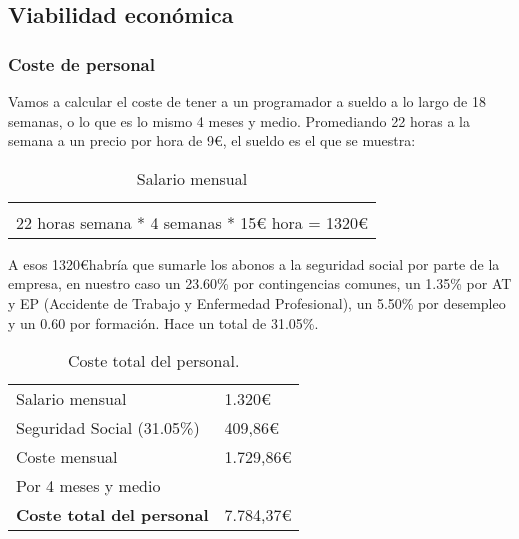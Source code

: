 \subsection{Viabilidad económica}

\subsubsection{Coste de personal}
Vamos a calcular el coste de tener a un programador a sueldo a lo largo de 18 semanas, o lo que es lo mismo 4 meses y medio. Promediando 22 horas a la semana a un precio por hora de 9\euro  , el sueldo es el que se muestra:
\begin{table}[ht!]
\centering
\begin{tabular}{l}
\rowcolor[HTML]{EFEFEF} 
\multicolumn{1}{c}{\cellcolor[HTML]{EFEFEF}\textbf{Salario mensual}} \\
22 horas\/ semana * 4 semanas * 15\euro \/ hora = 1320\euro            
\end{tabular}
\caption{Salario mensual}
\label{CosteMensual}
\end{table}

A esos 1320\euro  habría que sumarle los abonos a la seguridad social por parte de la empresa, en nuestro caso un 23.60\% por contingencias comunes, un 1.35\% por AT y EP (Accidente de Trabajo y Enfermedad Profesional), un 5.50\% por desempleo y un 0.60 por formación. \cite{seguridadsocial} Hace un total de 31.05\%. 

\begin{table}[ht!]
\centering
\label{my-label}
\begin{tabular}{ll}
Salario mensual          	& 1.320\euro    \\
Seguridad Social (31.05\%) 	& 409,86\euro  \\ \hline
Coste mensual            	& 1.729,86\euro \\
Por 4 meses y medio         &             \\ \hline
\textbf{Coste total del personal}     & 7.784,37\euro 
\end{tabular}
\caption{Coste total del personal.}
\end{table}

